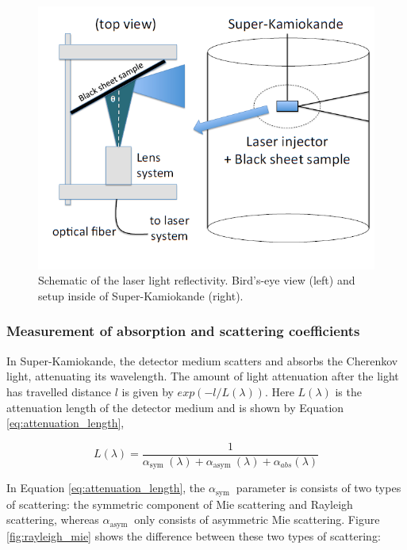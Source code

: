 \begin{figure}
    \includegraphics[width=\textwidth]{Figures/blacksheetrefsetup.png}
\caption{Schematic of the laser light reflectivity. Bird's-eye view (left) and setup inside of Super-Kamiokande (right).}
    \label{fig:blacksheetrefsetup}
\end{figure}


\subsubsection{Measurement of absorption and scattering coefficients}

In Super-Kamiokande, the detector medium scatters and absorbs the Cherenkov light, attenuating its wavelength. The amount of light attenuation after the light has travelled distance $l$ is given by $exp(-l/L(\lambda))$. Here $L(\lambda)$ is the attenuation length of the detector medium and is shown by Equation \ref{eq:attenuation_length}, 

\begin{equation}
L(\lambda)=\frac{1}{\alpha_{\text {sym }}(\lambda)+\alpha_{\text {asym }}(\lambda)+\alpha_{a b s}(\lambda)}
\label{eq:attenuation_length}
\end{equation}

In Equation \ref{eq:attenuation_length}, the $\alpha_{\text {sym }}$ parameter is consists of two types of scattering: the symmetric component of Mie scattering and Rayleigh scattering, whereas $\alpha_{\text {asym }}$ only consists of asymmetric Mie scattering.   Figure \ref{fig:rayleigh_mie} shows the difference between these two types of scattering:


